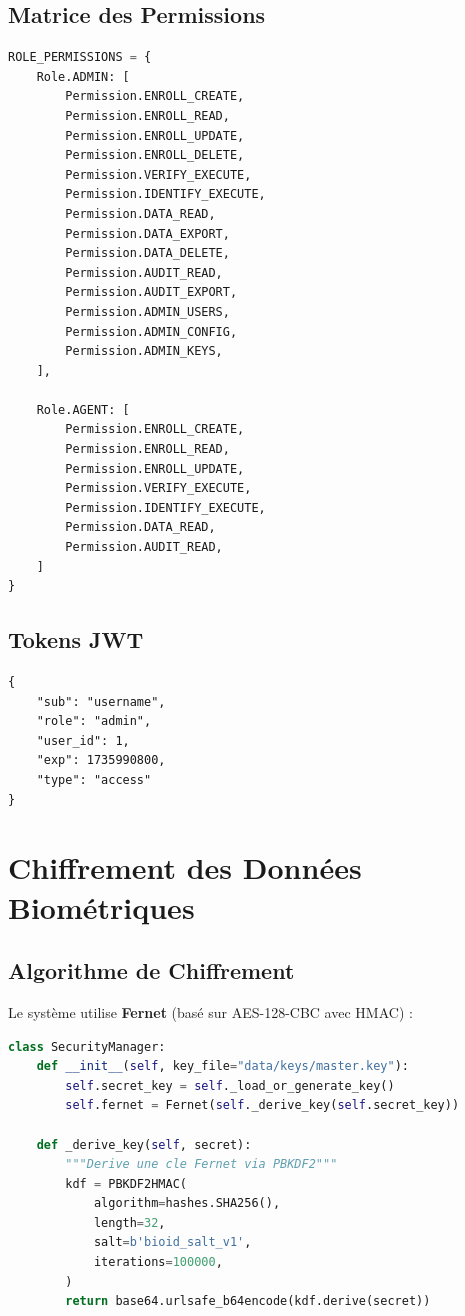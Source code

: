 \documentclass[12pt,a4paper]{report}
\begin{document}
\subsection{Matrice des Permissions}

\begin{lstlisting}[caption={Configuration RBAC},language=Python]
ROLE_PERMISSIONS = {
    Role.ADMIN: [
        Permission.ENROLL_CREATE,
        Permission.ENROLL_READ,
        Permission.ENROLL_UPDATE,
        Permission.ENROLL_DELETE,
        Permission.VERIFY_EXECUTE,
        Permission.IDENTIFY_EXECUTE,
        Permission.DATA_READ,
        Permission.DATA_EXPORT,
        Permission.DATA_DELETE,
        Permission.AUDIT_READ,
        Permission.AUDIT_EXPORT,
        Permission.ADMIN_USERS,
        Permission.ADMIN_CONFIG,
        Permission.ADMIN_KEYS,
    ],
    
    Role.AGENT: [
        Permission.ENROLL_CREATE,
        Permission.ENROLL_READ,
        Permission.ENROLL_UPDATE,
        Permission.VERIFY_EXECUTE,
        Permission.IDENTIFY_EXECUTE,
        Permission.DATA_READ,
        Permission.AUDIT_READ,
    ]
}
\end{lstlisting}

\subsection{Tokens JWT}

\begin{lstlisting}[caption={Structure du token JWT},language={}]
{
    "sub": "username",
    "role": "admin",
    "user_id": 1,
    "exp": 1735990800,
    "type": "access"
}
\end{lstlisting}

\section{Chiffrement des Données Biométriques}

\subsection{Algorithme de Chiffrement}

Le système utilise \textbf{Fernet} (basé sur AES-128-CBC avec HMAC) :

\begin{lstlisting}[caption={SecurityManager - Chiffrement},language=Python]
class SecurityManager:
    def __init__(self, key_file="data/keys/master.key"):
        self.secret_key = self._load_or_generate_key()
        self.fernet = Fernet(self._derive_key(self.secret_key))
    
    def _derive_key(self, secret):
        """Derive une cle Fernet via PBKDF2"""
        kdf = PBKDF2HMAC(
            algorithm=hashes.SHA256(),
            length=32,
            salt=b'bioid_salt_v1',
            iterations=100000,
        )
        return base64.urlsafe_b64encode(kdf.derive(secret))
\end{lstlisting}
\end{document}
